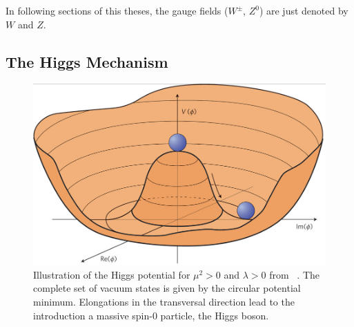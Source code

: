  In following sections of this theses, the gauge fields ($W^\pm$, $Z^0$) are just denoted by $W$ and $Z$.



 
\subsection{The Higgs Mechanism}\label{Higgsm}
\begin{figure}[h]
	\centering
	\includegraphics[width=0.4\linewidth]{Pics/cp1/Higgs}
	\caption{Illustration of the Higgs potential for $\mu^2>0 $ and $\lambda>0$ from ~\cite{Ellis:2013jnq}. The complete set of vacuum states is given by the circular potential minimum. Elongations in the transversal direction lead to the introduction a massive spin-0 particle, the Higgs boson.}
	
	\label{fig:Higgs}
\end{figure}

